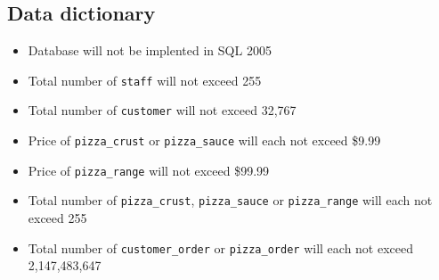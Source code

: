 \subsection{Data dictionary}

\begin{itemize}
\item Database will not be implented in SQL 2005
\item Total number of \texttt{staff} will not exceed 255
\item Total number of \texttt{customer} will not exceed 32,767
\item Price of \texttt{pizza_crust} or \texttt{pizza_sauce} will each not exceed \$9.99
\item Price of \texttt{pizza_range} will not exceed \$99.99
\item Total number of \texttt{pizza_crust}, \texttt{pizza_sauce} or \texttt{pizza_range} will each not exceed 255
\item Total number of \texttt{customer_order} or \texttt{pizza_order} will each not exceed 2,147,483,647
\end{itemize}